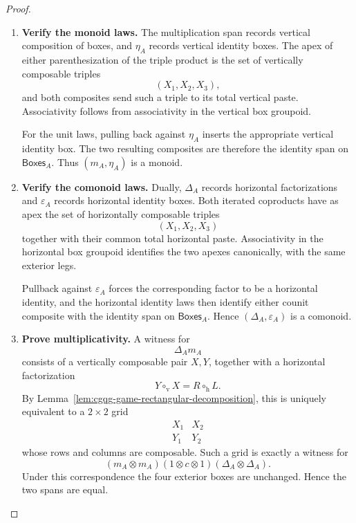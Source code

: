 \documentclass[oneside]{article}
\newcommand{\Boxes}{\mathsf{Boxes}}
\theoremstyle{plain}
\theoremstyle{definition}
\theoremstyle{remark}
\begin{document}
\begin{proof}
    \leavevmode
    \begin{enumerate}[beginpenalty=10000]
        \item \textbf{Verify the monoid laws.}
        The multiplication span records vertical composition of boxes,
        and \(\eta_A\) records vertical identity boxes. The apex of
        either parenthesization of the triple product is the set of
        vertically composable triples
        \[
            (X_1,X_2,X_3),
        \]
        and both composites send such a triple to its total vertical
        paste. Associativity follows from associativity in the vertical
        box groupoid.

        For the unit laws, pulling back against \(\eta_A\) inserts the
        appropriate vertical identity box. The two resulting composites
        are therefore the identity span on \(\Boxes_A\). Thus
        \((m_A,\eta_A)\) is a monoid.

        \item \textbf{Verify the comonoid laws.}
        Dually, \(\Delta_A\) records horizontal factorizations and
        \(\varepsilon_A\) records horizontal identity boxes. Both
        iterated coproducts have as apex the set of horizontally
        composable triples
        \[
            (X_1,X_2,X_3)
        \]
        together with their common total horizontal paste. Associativity
        in the horizontal box groupoid identifies the two apexes
        canonically, with the same exterior legs.

        Pullback against \(\varepsilon_A\) forces the corresponding
        factor to be a horizontal identity, and the horizontal identity
        laws then identify either counit composite with the identity
        span on \(\Boxes_A\). Hence \((\Delta_A,\varepsilon_A)\) is a
        comonoid.

        \item \textbf{Prove multiplicativity.}
        A witness for
        \[
            \Delta_A m_A
        \]
        consists of a vertically composable pair \(X,Y\), together with
        a horizontal factorization
        \[
            Y\circ_{\mathrm v}X
            =
            R\circ_{\mathrm h}L.
        \]
        By Lemma~\ref{lem:cgqg-game-rectangular-decomposition}, this is
        uniquely equivalent to a \(2\times2\) grid
        \[
            \begin{matrix}
                X_1 & X_2\\
                Y_1 & Y_2
            \end{matrix}
        \]
        whose rows and columns are composable. Such a grid is exactly a
        witness for
        \[
            (m_A\otimes m_A)
            (1\otimes c\otimes1)
            (\Delta_A\otimes\Delta_A).
        \]
        Under this correspondence the four exterior boxes are unchanged.
        Hence the two spans are equal.


\end{enumerate}
\end{proof}
\end{document}
